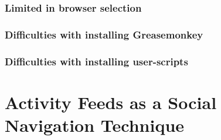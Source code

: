 \subsubsection{Limited in browser selection}

\subsubsection{Difficulties with installing Greasemonkey}

\subsubsection{Difficulties with installing user-scripts}


\section{Activity Feeds as a Social Navigation Technique}
